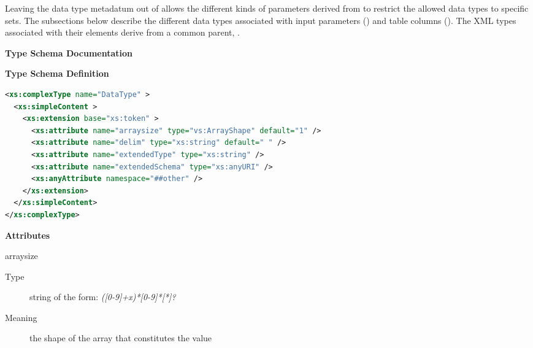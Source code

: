 \documentclass[11pt,a4paper]{ivoa}
\begin{document}

Leaving the data type metadatum out of 
allows the different kinds of parameters derived from
 to restrict the allowed data types to
specific sets.  The subsections below describe the different data
types associated with input parameters
() and table
columns ().  The
XML types associated with their  elements
derive from a common parent, .


\begin{generated}
\begingroup
      	\renewcommand*\descriptionlabel[1]{%
      	\hbox to 5.5em{\emph{#1}\hfil}}\vspace{2ex}\noindent\textbf{ Type Schema Documentation}



\vspace{1ex}\noindent\textbf{ Type Schema Definition}

\begin{lstlisting}[language=XML,basicstyle=\footnotesize]
<xs:complexType name="DataType" >
  <xs:simpleContent >
    <xs:extension base="xs:token" >
      <xs:attribute name="arraysize" type="vs:ArrayShape" default="1" />
      <xs:attribute name="delim" type="xs:string" default=" " />
      <xs:attribute name="extendedType" type="xs:string" />
      <xs:attribute name="extendedSchema" type="xs:anyURI" />
      <xs:anyAttribute namespace="##other" />
    </xs:extension>
  </xs:simpleContent>
</xs:complexType>
\end{lstlisting}

\vspace{0.5ex}\noindent\textbf{ Attributes}

\begingroup\small\begin{bigdescription}
\item[arraysize]
\begin{description}
\item[Type] string of the form: \emph{([0-9]+x)*[0-9]*[*]?}
\item[Meaning] 
                     the shape of the array that constitutes the value
                  

\end{description}
\end{bigdescription}
\end{generated}
\end{document}
